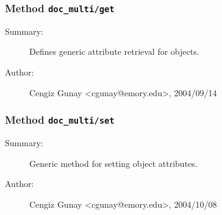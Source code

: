 \subsubsection[Method \texttt{get}]{Method \texttt{doc\_multi/get}}%
%
\label{ref_doc_multi__get}%
\hypertarget{ref_doc_multi__get}{}%
\begin{description}
\item[Summary:]Defines generic attribute retrieval for objects.
%
%
%
%
%
%
%
\item[Author:]%
Cengiz Gunay <cgunay@emory.edu>, 2004/09/14%
\end{description}
\methodline%
\subsubsection[Method \texttt{set}]{Method \texttt{doc\_multi/set}}%
%
\label{ref_doc_multi__set}%
\hypertarget{ref_doc_multi__set}{}%
\begin{description}
\item[Summary:]Generic method for setting object attributes.
%
%
%
%
%
%
%
\item[Author:]%
Cengiz Gunay <cgunay@emory.edu>, 2004/10/08%
\end{description}
\methodline%

